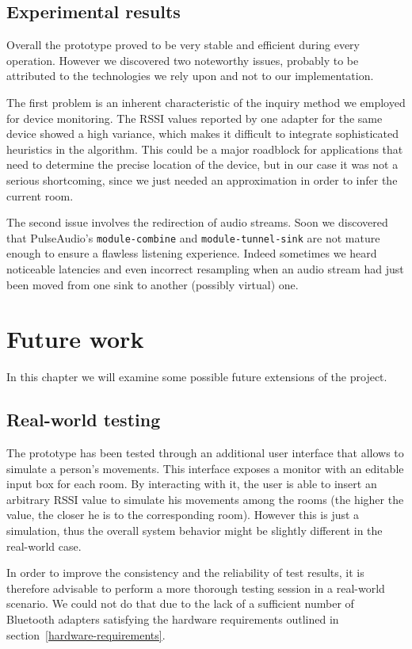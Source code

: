 \documentclass[conference]{IEEEtran}
\begin{document}
\subsection{Experimental results}
Overall the prototype proved to be very stable and efficient during every operation. However we discovered two noteworthy issues, probably to be attributed to the technologies we rely upon and not to our implementation.

The first problem is an inherent characteristic of the inquiry method we employed for device monitoring. The RSSI values reported by one adapter for the same device showed a high variance, which makes it difficult to integrate sophisticated heuristics in the algorithm. This could be a major roadblock for applications that need to determine the precise location of the device, but in our case it was not a serious shortcoming, since we just needed an approximation in order to infer the current room.

The second issue involves the redirection of audio streams. Soon we discovered that PulseAudio's \texttt{module-combine} and \texttt{module-tunnel-sink} are not mature enough to ensure a flawless listening experience. Indeed sometimes we heard noticeable latencies and even incorrect resampling when an audio stream had just been moved from one sink to another (possibly virtual) one.


\vspace{4mm}
\section{Future work}
In this chapter we will examine some possible future extensions of the project.

\subsection{Real-world testing}
The prototype has been tested through an additional user interface that allows to simulate a person's movements. This interface exposes a monitor with an editable input box for each room. By interacting with it, the user is able to insert an arbitrary RSSI value to simulate his movements among the rooms (the higher the value, the closer he is to the corresponding room). However this is just a simulation, thus the overall system behavior might be slightly different in the real-world case.

In order to improve the consistency and the reliability of test results, it is therefore advisable to perform a more thorough testing session in a real-world scenario. We could not do that due to the lack of a sufficient number of Bluetooth adapters satisfying the hardware requirements outlined in section~\ref{hardware-requirements}.
\end{document}
